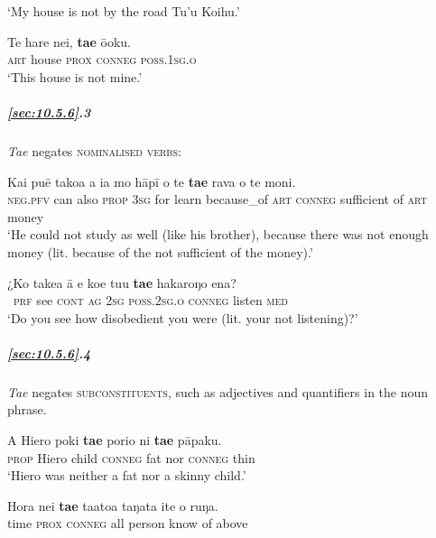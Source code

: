 \glt 
‘My house is not by the road Tu’u Koihu.’ \textstyleExampleref{[Notes]}
\z

\ea\label{ex:10.144}
\gll Te hare nei, \textbf{ta{\ꞌ}e} ō{\ꞌ}oku. \\
\textsc{art} house \textsc{prox} \textsc{conneg} \textsc{poss.1sg.o} \\

\glt 
‘This house is not mine.’ \textstyleExampleref{[R229.268]} 
\z

\subparagraph{\ref{sec:10.5.6}.3} \textit{Ta{\ꞌ}e} negates \textsc{nominalised verbs}:

\ea\label{ex:10.145}
\gll Kai puē tako{\ꞌ}a a ia mo hāpī {\ꞌ}o te \textbf{ta{\ꞌ}e} rava o te moni.\\
\textsc{neg.pfv} can also \textsc{prop} \textsc{3sg} for learn because\_of \textsc{art} \textsc{conneg} sufficient of \textsc{art} money\\

\glt 
‘He could not study as well (like his brother), because there was not enough money (lit. because of the not sufficient of the money).’ \textstyleExampleref{[R231.006]} 
\z

\ea\label{ex:10.146}
\gll ¿Ko take{\ꞌ}a {\ꞌ}ā e koe tu{\ꞌ}u \textbf{ta{\ꞌ}e} hakaroŋo ena? \\
~\textsc{prf} see \textsc{cont} \textsc{ag} \textsc{2sg} \textsc{poss.2sg.o} \textsc{conneg} listen \textsc{med} \\

\glt 
‘Do you see how disobedient you were (lit. your not listening)?’ \textstyleExampleref{[R481.117]} 
\z

\subparagraph{\ref{sec:10.5.6}.4} \textit{Ta{\ꞌ}e} negates \textsc{subconstituents}, such as adjectives  and quantifiers  in the noun phrase.

\ea\label{ex:10.147}
\gll A Hiero poki \textbf{ta{\ꞌ}e} porio ni \textbf{ta{\ꞌ}e} pāpaku. \\
\textsc{prop} Hiero child \textsc{conneg} fat nor \textsc{conneg} thin \\

\glt 
‘Hiero was neither a fat nor a skinny child.’ \textstyleExampleref{[R315.020]} 
\z

\ea\label{ex:10.148}
\gll Hora nei \textbf{ta{\ꞌ}e} ta{\ꞌ}ato{\ꞌ}a taŋata {\ꞌ}ite o ruŋa. \\
time \textsc{prox} \textsc{conneg} all person know of above \\

